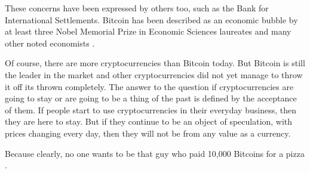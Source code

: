 \documentclass[11pt,a4paper,compsoc,conference]{IEEEtran}
\begin{document}
These concerns have been expressed by others too, such as the Bank for International Settlements\citep{hype}. Bitcoin has been described as an economic bubble by at least three Nobel Memorial Prize in Economic Sciences laureates \citep{robert,stiglitz,thaler} and many other noted economists \citep{kearns,guardian,krugman}. 

Of course, there are more cryptocurrencies than Bitcoin today. But Bitcoin is still the leader in the market and other cryptocurrencies did not yet manage to throw it off its thrown completely. The answer to the question if cryptocurrencies are going to stay or are going to be a thing of the past is defined by the acceptance of them. If people start to use cryptocurrencies in their everyday business, then they are here to stay. But if they continue to be an object of speculation, with prices changing every day, then they will not be from any value as a currency. 

Because clearly, no one wants to be that guy who paid 10,000 Bitcoins for a pizza \citep{pizzaguy}. 

\newpage

\printbibliography[title={Bibliography}] %
\pagebreak
\listoffigures
\end{document}
